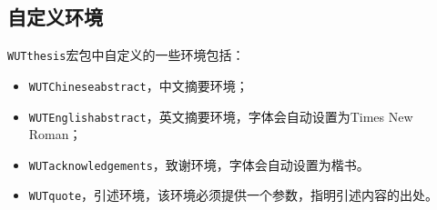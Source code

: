 \subsection{自定义环境}


\par \texttt{WUTthesis}宏包中自定义的一些环境包括：
\begin{itemize}
\item \texttt{WUTChineseabstract}，中文摘要环境；
\item \texttt{WUTEnglishabstract}，英文摘要环境，字体会自动设置为{\selectfont Times New Roman}；
\item \texttt{WUTacknowledgements}，致谢环境，字体会自动设置为{\kaishu 楷书}。
\item \texttt{WUTquote}，引述环境，该环境必须提供一个参数，指明引述内容的出处。
\end{itemize}




